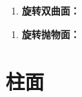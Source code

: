 \begin{frame}
	\linespread{1.2}
	\begin{enumerate}
	  \addtocounter{enumi}{1}
	  \item {\bf 旋转双曲面：}
	  \bigskip\pause 
	  \begin{center}
   	  \end{center}
	\end{enumerate}
\end{frame}

\begin{frame}
	\linespread{1.2}
	\begin{enumerate}
	  \addtocounter{enumi}{2}
	  \item {\bf 旋转抛物面：}
	  \bigskip\pause 
	  \begin{center}
   	  \end{center}
	\end{enumerate}
\end{frame}

\section{柱面}

